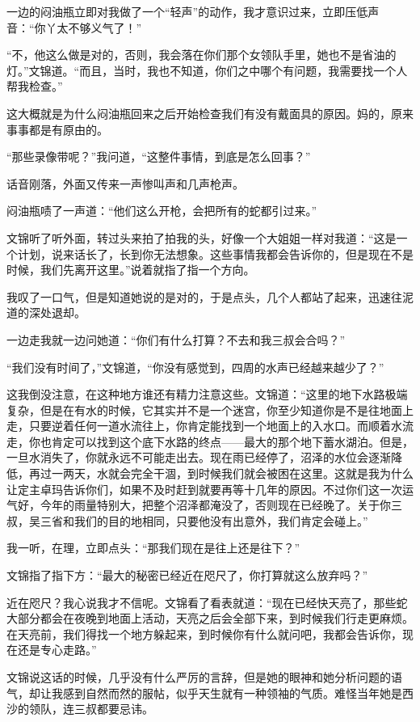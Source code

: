 一边的闷油瓶立即对我做了一个“轻声”的动作，我才意识过来，立即压低声音：“你丫太不够义气了！”

“不，他这么做是对的，否则，我会落在你们那个女领队手里，她也不是省油的灯。”文锦道。“而且，当时，我也不知道，你们之中哪个有问题，我需要找一个人帮我检查。”

这大概就是为什么闷油瓶回来之后开始检查我们有没有戴面具的原因。妈的，原来事事都是有原由的。

“那些录像带呢？”我问道，“这整件事情，到底是怎么回事？”

话音刚落，外面又传来一声惨叫声和几声枪声。

闷油瓶啧了一声道：“他们这么开枪，会把所有的蛇都引过来。”

文锦听了听外面，转过头来拍了拍我的头，好像一个大姐姐一样对我道：“这是一个计划，说来话长了，长到你无法想象。这些事情我都会告诉你的，但是现在不是时候，我们先离开这里。”说着就指了指一个方向。

我叹了一口气，但是知道她说的是对的，于是点头，几个人都站了起来，迅速往泥道的深处退却。

一边走我就一边问她道：“你们有什么打算？不去和我三叔会合吗？”

“我们没有时间了，”文锦道，“你没有感觉到，四周的水声已经越来越少了？”

这我倒没注意，在这种地方谁还有精力注意这些。文锦道：“这里的地下水路极端复杂，但是在有水的时候，它其实并不是一个迷宫，你至少知道你是不是往地面上走，只要逆着任何一道水流往上，你肯定能找到一个地面上的入水口。而顺着水流走，你也肯定可以找到这个底下水路的终点——最大的那个地下蓄水湖泊。但是，一旦水消失了，你就永远不可能走出去。现在雨已经停了，沼泽的水位会逐渐降低，再过一两天，水就会完全干涸，到时候我们就会被困在这里。这就是我为什么让定主卓玛告诉你们，如果不及时赶到就要再等十几年的原因。不过你们这一次运气好，今年的雨量特别大，把整个沼泽都淹没了，否则现在已经晚了。关于你三叔，吴三省和我们的目的地相同，只要他没有出意外，我们肯定会碰上。”

我一听，在理，立即点头：“那我们现在是往上还是往下？”

文锦指了指下方：“最大的秘密已经近在咫尺了，你打算就这么放弃吗？”

近在咫尺？我心说我才不信呢。文锦看了看表就道：“现在已经快天亮了，那些蛇大部分都会在夜晚到地面上活动，天亮之后会全部下来，到时候我们行走更麻烦。在天亮前，我们得找一个地方躲起来，到时候你有什么就问吧，我都会告诉你，现在还是专心走路。”

文锦说这话的时候，几乎没有什么严厉的言辞，但是她的眼神和她分析问题的语气，却让我感到自然而然的服帖，似乎天生就有一种领袖的气质。难怪当年她是西沙的领队，连三叔都要忌讳。

